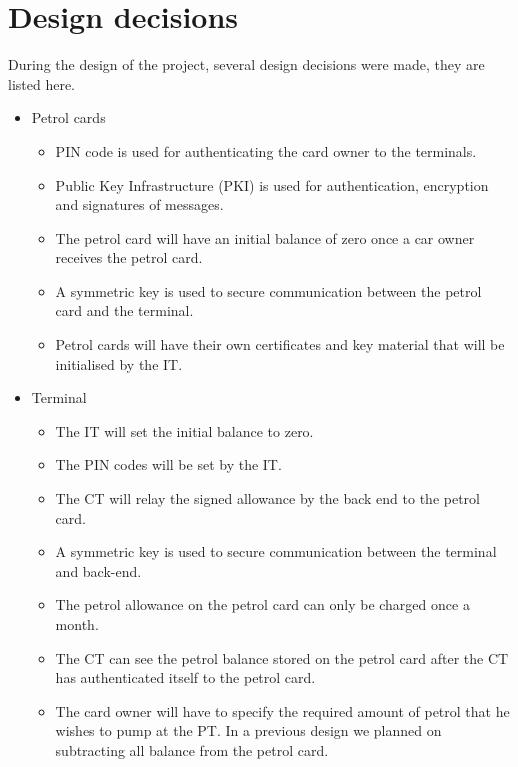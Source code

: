 \section{Design decisions}
During the design of the project, several design decisions were made, they are listed here.
\begin{itemize}
\item Petrol cards
\begin{itemize}
\item PIN code is used for authenticating the card owner to the terminals.
\item Public Key Infrastructure (PKI) is used for authentication, encryption and signatures of messages.
\item The petrol card will have an initial balance of zero once a car owner receives the petrol card. 
\item A symmetric key is used to secure communication between the petrol card and the terminal.
\item Petrol cards will have their own certificates and key material that will be initialised by the IT.
\end{itemize}

\item Terminal
\begin{itemize}
\item The IT will set the initial balance to zero.
\item The PIN codes will be set by the IT.
\item The CT will relay the signed allowance by the back end to the petrol card.
\item A symmetric key is used to secure communication between the terminal and back-end.
\item The petrol allowance on the petrol card can only be charged once a month.
\item The CT can see the petrol balance stored on the petrol card after the CT has authenticated itself to the petrol card.
\item The card owner will have to specify the required amount of petrol that he wishes to pump at the PT. In a previous design we planned on subtracting all balance from the petrol card. 
\end{itemize}






\end{itemize}
